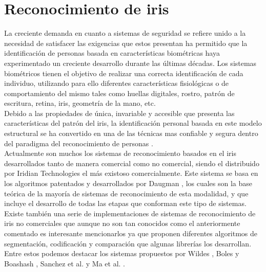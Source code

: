 
\chapter{Reconocimiento de iris} %

\label{Capítulo 2} %




La creciente demanda en cuanto a sistemas de seguridad se refiere unido a la necesidad de satisfacer las exigencias que estos presentan ha permitido que la identificación de personas basada en características biométricas haya experimentado un creciente desarrollo durante las últimas décadas. Los sistemas biométricos tienen el objetivo de realizar una correcta identificación de cada individuo, utilizando para ello diferentes características fisiológicas o de comportamiento del mismo tales como huellas digitales, rostro, patrón de escritura, retina, iris, geometría de la mano, etc. \\

Debido a las propiedades de única, invariable y accesible que presenta las características del patrón del iris, la identificación personal basada en este modelo estructural se ha convertido en una de las técnicas mas confiable y segura dentro del paradigma del reconocimiento de personas\cite{Reference1} \cite{Reference2} \cite{Reference3} \cite{Reference4} \cite{Reference5}. \\

Actualmente son muchos los sistemas de reconocimiento basados en el iris desarrollados tanto de manera comercial como no comercial, siendo el distribuido por Iridian Technologies \cite{Reference6} el más existoso comercialmente. Este sistema se basa en los algoritmos patentados y desarrollados por Daugman \cite{Reference1}, los cuales son la base teórica de la mayoría de sistemas de reconocimiento de esta modalidad, y que incluye el desarrollo de todas las etapas que conforman este tipo de sistemas. Existe también una serie de implementaciones de sistemas de reconocimiento de iris no comerciales que aunque no son tan conocidos como el anteriormente comentado es interesante mencionarlos ya que proponen diferentes algoritmos de segmentación, codificación y comparación que algunas librerías los desarrollan. Entre estos podemos destacar los sistemas propuestos por Wildes \cite{Reference4} , Boles y Boashash \cite{Reference2}, Sanchez et al. \cite{Reference7} y Ma et al. \cite{Reference3}.  \\ 


